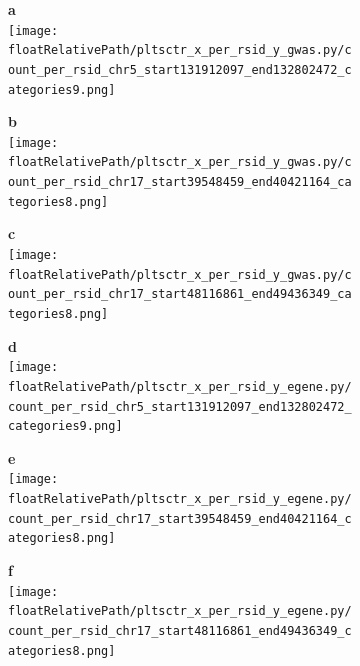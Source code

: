 \begin{figure}[!tbp]

\begin{subfigure}[]{.32\textwidth}
\textbf{a}
\\
\texttt{[image: \\floatRelativePath/pltsctr\_x\_per\_rsid\_y\_gwas.py/count\_per\_rsid\_chr5\_start131912097\_end132802472\_categories9.png]}
\end{subfigure}
%
\begin{subfigure}[]{.32\textwidth}
\textbf{b}
\\
\texttt{[image: \\floatRelativePath/pltsctr\_x\_per\_rsid\_y\_gwas.py/count\_per\_rsid\_chr17\_start39548459\_end40421164\_categories8.png]}
\end{subfigure}
%
\begin{subfigure}[]{.32\textwidth}
\textbf{c}
\\
\texttt{[image: \\floatRelativePath/pltsctr\_x\_per\_rsid\_y\_gwas.py/count\_per\_rsid\_chr17\_start48116861\_end49436349\_categories8.png]}
\end{subfigure}


\begin{subfigure}[]{.32\textwidth}
\textbf{d}
\\
\texttt{[image: \\floatRelativePath/pltsctr\_x\_per\_rsid\_y\_egene.py/count\_per\_rsid\_chr5\_start131912097\_end132802472\_categories9.png]}
\end{subfigure}
%
\begin{subfigure}[]{.32\textwidth}
\textbf{e}
\\
\texttt{[image: \\floatRelativePath/pltsctr\_x\_per\_rsid\_y\_egene.py/count\_per\_rsid\_chr17\_start39548459\_end40421164\_categories8.png]}
\end{subfigure}
%
\begin{subfigure}[]{.32\textwidth}
\textbf{f}
\\
\texttt{[image: \\floatRelativePath/pltsctr\_x\_per\_rsid\_y\_egene.py/count\_per\_rsid\_chr17\_start48116861\_end49436349\_categories8.png]}
\end{subfigure}


\end{figure}
